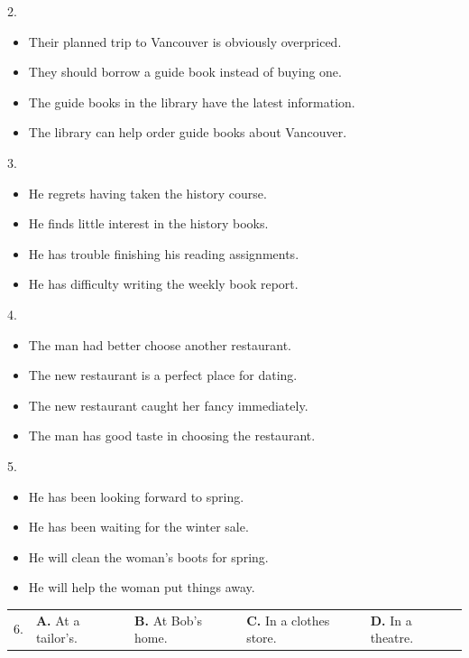 \documentclass[UTF8,11pt]{ctexart}
\begin{document}
2.


\begin{itemize}[leftmargin=2em,itemsep=.2em,topsep=.4em]\item[A.] Their planned trip to Vancouver is obviously overpriced.
\item[B.] They should borrow a guide book instead of buying one.
\item[C.] The guide books in the library have the latest information.
\item[D.] The library can help order guide books about Vancouver.
\end{itemize}

3.


\begin{itemize}[leftmargin=2em,itemsep=.2em,topsep=.4em]\item[A.] He regrets having taken the history course.
\item[B.] He finds little interest in the history books.
\item[C.] He has trouble finishing his reading assignments.
\item[D.] He has difficulty writing the weekly book report.
\end{itemize}

4.


\begin{itemize}[leftmargin=2em,itemsep=.2em,topsep=.4em]\item[A.] The man had better choose another restaurant.
\item[B.] The new restaurant is a perfect place for dating.
\item[C.] The new restaurant caught her fancy immediately.
\item[D.] The man has good taste in choosing the restaurant.
\end{itemize}

5.


\begin{itemize}[leftmargin=2em,itemsep=.2em,topsep=.4em]\item[A.] He has been looking forward to spring.
\item[B.] He has been waiting for the winter sale.
\item[C.] He will clean the woman’s boots for spring.
\item[D.] He will help the woman put things away.
\end{itemize}

\noindent\begin{tabularx}{\linewidth}{@{}lXXXX@{}}6. & \textbf{A.} At a tailor’s. & \textbf{B.} At Bob’s home. & \textbf{C.} In a clothes store. & \textbf{D.} In a theatre.\\\end{tabularx}\par
\end{document}
